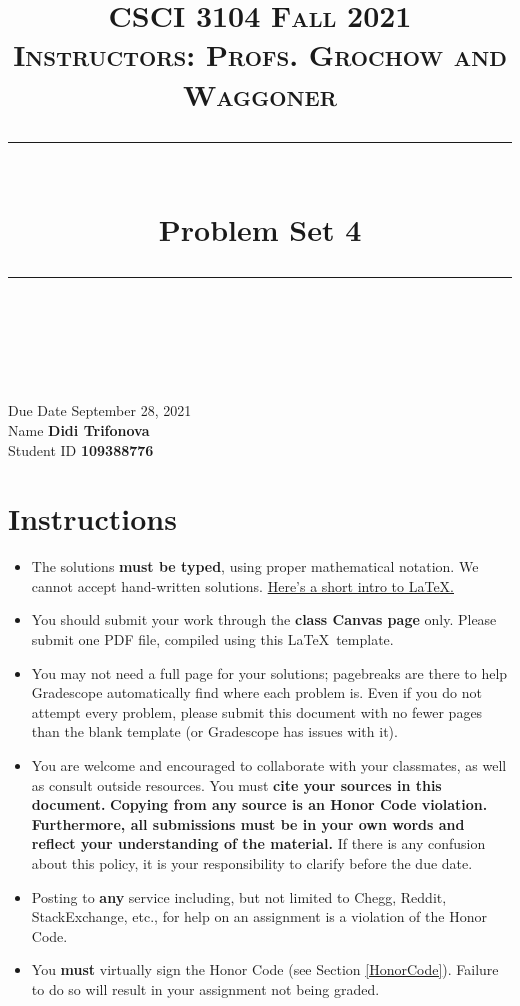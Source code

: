\documentclass[11pt]{article}
\title{
\normalfont \normalsize 
\textsc{CSCI 3104 Fall 2021 \\ 
Instructors: Profs. Grochow and Waggoner} \\
[10pt] 
\rule{\linewidth}{0.5pt} \\[6pt] 
\huge Problem Set 4 \\
\rule{\linewidth}{2pt}  \\[10pt]
}
\date{}
\theoremstyle{definition}
\theoremstyle{definition}
\theoremstyle{definition}
\begin{document}
\maketitle


\noindent
Due Date \dotfill September 28, 2021 \\
Name \dotfill \textbf{Didi Trifonova} \\
Student ID \dotfill \textbf{109388776} 

\tableofcontents

\section{Instructions}
 \begin{itemize}
	\item The solutions \textbf{must be typed}, using proper mathematical notation. We cannot accept hand-written solutions. \href{http://ece.uprm.edu/~caceros/latex/introduction.pdf}{Here's a short intro to \LaTeX.}
	\item You should submit your work through the \textbf{class Canvas page} only. Please submit one PDF file, compiled using this \LaTeX \ template.
	\item You may not need a full page for your solutions; pagebreaks are there to help Gradescope automatically find where each problem is. Even if you do not attempt every problem, please submit this document with no fewer pages than the blank template (or Gradescope has issues with it).

	\item You are welcome and encouraged to collaborate with your classmates, as well as consult outside resources. You must \textbf{cite your sources in this document.} \textbf{Copying from any source is an Honor Code violation. Furthermore, all submissions must be in your own words and reflect your understanding of the material.} If there is any confusion about this policy, it is your responsibility to clarify before the due date. 

	\item Posting to \textbf{any} service including, but not limited to Chegg, Reddit, StackExchange, etc., for help on an assignment is a violation of the Honor Code.

	\item You \textbf{must} virtually sign the Honor Code (see Section \ref{HonorCode}). Failure to do so will result in your assignment not being graded.
\end{itemize}
\end{document}
